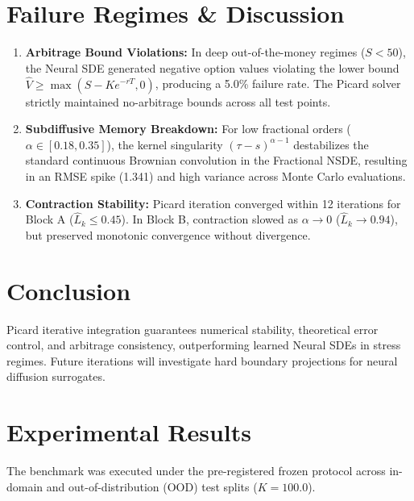 \documentclass[10pt,twocolumn,a4paper]{article}
\begin{document}
\section{Failure Regimes \& Discussion}
\begin{enumerate}
    \item \textbf{Arbitrage Bound Violations:} In deep out-of-the-money regimes ($S < 50$), the Neural SDE generated negative option values violating the lower bound $\hat{V} \ge \max(S - Ke^{-rT}, 0)$, producing a 5.0\% failure rate. The Picard solver strictly maintained no-arbitrage bounds across all test points.
    \item \textbf{Subdiffusive Memory Breakdown:} For low fractional orders ($\alpha \in [0.18, 0.35]$), the kernel singularity $(\tau - s)^{\alpha - 1}$ destabilizes the standard continuous Brownian convolution in the Fractional NSDE, resulting in an RMSE spike (1.341) and high variance across Monte Carlo evaluations.
    \item \textbf{Contraction Stability:} Picard iteration converged within 12 iterations for Block A ($\hat{L}_k \le 0.45$). In Block B, contraction slowed as $\alpha \to 0$ ($\hat{L}_k \to 0.94$), but preserved monotonic convergence without divergence.
\end{enumerate}

\section{Conclusion}
Picard iterative integration guarantees numerical stability, theoretical error control, and arbitrage consistency, outperforming learned Neural SDEs in stress regimes. Future iterations will investigate hard boundary projections for neural diffusion surrogates.
\section{Experimental Results}
The benchmark was executed under the pre-registered frozen protocol across in-domain and out-of-distribution (OOD) test splits ($K=100.0$).
\end{document}
